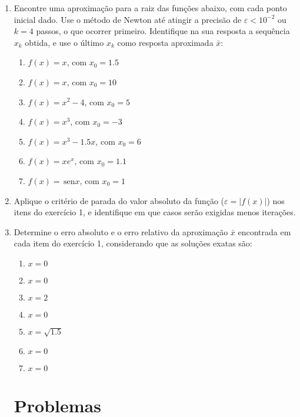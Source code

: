 \documentclass[a4paper]{article}
\providecommand{\sin}{} \renewcommand{\sin}{\hspace{2pt}\mathrm{sen}}
\begin{document}
\begin{enumerate}
\item Encontre uma aproximação para a raiz das funções abaixo, com
  cada ponto inicial dado. Use o método de Newton até atingir a
  precisão de $\varepsilon<10^{-2}$ ou $k=4$ passos, o que ocorrer
  primeiro. Identifique na sua resposta a sequência $x_k$ obtida, e
  use o último $x_k$ como resposta aproximada $\bar{x}$:

  \begin{enumerate}
  \item $f(x) = x$, com $x_0 = 1.5$
  \item $f(x) = x$, com $x_0 = 10$
  \item $f(x) = x^2 - 4$, com $x_0 = 5$
  \item $f(x) = x^3$, com $x_0 = -3$
  \item $f(x) = x^3-1.5x$, com $x_0 = 6$
  \item $f(x) = x e^x$, com $x_0 = 1.1$
  \item $f(x) = \sin x$, com $x_0 = 1$
  \end{enumerate}

\item Aplique o critério de parada do valor absoluto da função
  ($\varepsilon=|f(x)|$) nos itens do exercício 1, e identifique em
  que casos serão exigidas menos iterações.

\item Determine o erro absoluto e o erro relativo da aproximação
  $\bar{x}$ encontrada em cada item do exercício 1, considerando que
  as soluções exatas são:
  \begin{enumerate}
  \item $x=0$ %
  \item $x=0$ %
  \item $x=2$ %
  \item $x=0$ %
  \item $x=\sqrt{1.5}$ %
  \item $x=0$ %
  \item $x=0$ %
  \end{enumerate}

\section{Problemas}


\end{enumerate}
\end{document}
